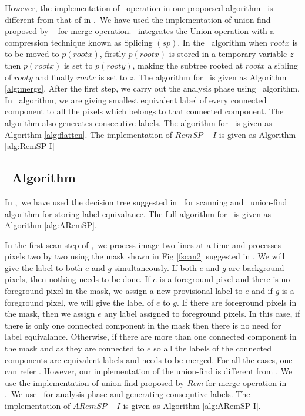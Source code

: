 
% 
However, the implementation of \merge\ operation in our proporsed algorithm
\remsp\ is different from that of in \lrpc.\
We have used the implementation of union-find proposed by \rems\ 
\cite{Patwary2010_RemSP} for merge operation. \rems\ integrates the Union
operation with a compression technique known as Splicing $(sp)$. In the \merge\
algorithm when $rootx$ is to be moved to $p(rootx)$, firstly $p(rootx)$ is
stored in a temporary variable $z$ then $p(rootx)$ is set to $p(rooty)$, making the
subtree rooted at $rootx$ a sibling of $rooty$ and finally $rootx$ is set to
$z$. The algorithm for \merge\ is given as Algorithm \ref{alg:merge}. After the first step, we carry
out the analysis phase using \flatten\ algorithm. In \flatten\ algorithm, we are
giving smallest equivalent label of every connected component to all the pixels
which belongs to that connected component. The algorithm also
generates consecutive labels. The algorithm for \flatten\ is given as Algorithm
\ref{alg:flatten}. The implementation of $RemSP-I$ is given as Algorithm
\ref{alg:RemSP-I}
% 


\subsection{\aremsp\ Algorithm}

In \aremsp,\ we have used the decision tree suggested in \arun\ 
for scanning and \rems\ union-find algorithm for storing label equivalance. The
full algorithm for \aremsp\ is given as Algorithm \ref{alg:ARemSP}.

In the first scan step of \aremsp,\ we process image two lines at a time and processes
pixels two by two using the mask shown in Fig \ref{fscan2} suggested in
\cite{He2012_ARun}.
We will give the label to both $e$ and $g$ simultaneously. If both $e$ and $g$ are background pixels,
then nothing needs to be done. If $e$ is a foreground pixel and there is no foreground pixel in the mask, we assign a 
new provisional label to $e$ and if $g$ is a foreground pixel, we will give the
label of $e$ to $g$. If there are foreground pixels in the mask, then we assign $e$ any label assigned to 
foreground pixels. In this case, if there is only one connected component in the mask then there is 
no need for label equivalance. Otherwise, if there are more than one connected component in the mask and as 
they are connected to $e$ so all the labels of the connected components are
equivalent labels and needs to be merged. For all the cases, one can refer \cite{He2012_ARun}.
However, our implementation of the union-find is different from \cite{He2012_ARun}.
We use the implementation of union-find proposed by {\em Rem} \cite{Patwary2010_RemSP} for merge operation in
\aremsp.\ We use \flatten\ for analysis phase and generating consequtive
labels. The implementation of $ARemSP-I$ is given as Algorithm
\ref{alg:ARemSP-I}.


% 





 
